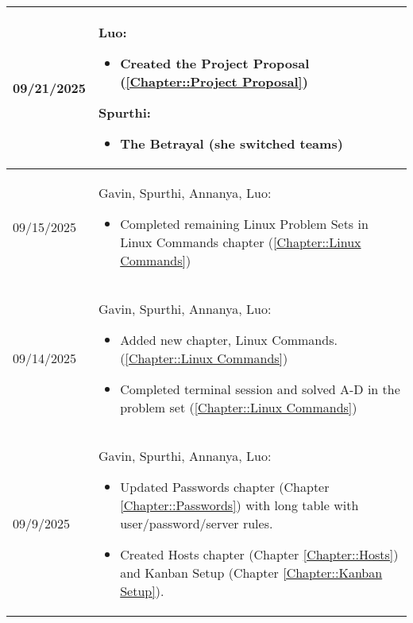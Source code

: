 \begin{longtable}{|l||p{13.5cm}|}
09/21/2025 & Luo:
\begin{itemize}[topsep=0pt,itemsep=0pt,parsep=0pt,partopsep=0pt,leftmargin=12pt]
\item Created the Project Proposal (\ref{Chapter::Project Proposal})
\end{itemize} 
Spurthi:
\begin{itemize}[topsep=0pt,itemsep=0pt,parsep=0pt,partopsep=0pt,leftmargin=12pt]
\item The Betrayal (she switched teams)
\end{itemize} 
\\ \hline

09/15/2025 & Gavin, Spurthi, Annanya, Luo:
\begin{itemize}[topsep=0pt,itemsep=0pt,parsep=0pt,partopsep=0pt,leftmargin=12pt]
\item Completed remaining Linux Problem Sets in Linux Commands chapter (\ref{Chapter::Linux Commands})
\end{itemize} 
\\ \hline

09/14/2025 & Gavin, Spurthi, Annanya, Luo:
\begin{itemize}[topsep=0pt,itemsep=0pt,parsep=0pt,partopsep=0pt,leftmargin=12pt]
\item Added new chapter, Linux Commands. (\ref{Chapter::Linux Commands})
\item Completed terminal session and solved A-D in the problem set  (\ref{Chapter::Linux Commands})
\end{itemize} 
\\ \hline



09/9/2025 & Gavin, Spurthi, Annanya, Luo:
\begin{itemize}[topsep=0pt,itemsep=0pt,parsep=0pt,partopsep=0pt,leftmargin=12pt]
\item Updated Passwords chapter (Chapter \ref{Chapter::Passwords}) with long table with user/password/server rules.
\item Created Hosts chapter (Chapter \ref{Chapter::Hosts}) and Kanban Setup (Chapter \ref{Chapter::Kanban Setup}).
\end{itemize} 
\\ \hline



\end{longtable}


